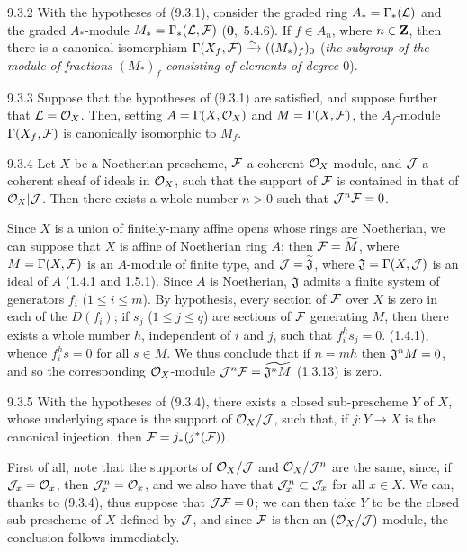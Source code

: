 \documentclass[../main.tex]{subfiles}
\begin{document}
\begin{env}[Corollary]{9.3.2}
    With the hypotheses of {\normalfont(9.3.1)}, consider the graded ring $A_*=\Gamma_*(\mathcal{L})$ and the graded $A_*$-module $M_*=\Gamma_*(\mathcal{L},\mathcal{F})$ {\normalfont(\textbf{0},~5.4.6)}.
    If $f\in A_n$, where $n\in\mathbf{Z}$, then there is a canonical isomorphism $\Gamma(X_f,\mathcal{F})\xrightarrow{\sim}((M_*)_f)_0$ (\emph{the subgroup of the module of fractions $(M_*)_f$ consisting of elements of degree $0$}).
\end{env}
\begin{env}[Corollary]{9.3.3}
    Suppose that the hypotheses of {\normalfont(9.3.1)} are satisfied, and suppose further that $\mathcal{L}=\mathcal{O}_X$.
    Then, setting $A=\Gamma(X,\mathcal{O}_X)$ and $M=\Gamma(X,\mathcal{F})$, the $A_f$-module $\Gamma(X_f,\mathcal{F})$ is canonically isomorphic to $M_f$.
\end{env}
\begin{env}[Proposition]{9.3.4}
    Let $X$ be a Noetherian prescheme, $\mathcal{F}$ a coherent $\mathcal{O}_X$-module, and $\mathcal{J}$ a coherent sheaf of ideals in $\mathcal{O}_X$, such that the support of $\mathcal{F}$ is contained in that of $\mathcal{O}_X|\mathcal{J}$.
    Then there exists a whole number $n>0$ such that $\mathcal{J}^n\mathcal{F}=0$.
\end{env}

Since $X$ is a union of finitely-many affine opens whose rings are Noetherian, we can suppose that $X$ is affine of Noetherian ring $A$; then $\mathcal{F}=\widetilde{M}$, where $M=\Gamma(X,\mathcal{F})$ is an $A$-module of finite type, and $\mathcal{J}=\widetilde{\mathfrak{J}}$, where $\mathfrak{J}=\Gamma(X,\mathcal{J})$ is an ideal of $A$ (1.4.1 and 1.5.1).
Since $A$ is Noetherian, $\mathfrak{J}$ admits a finite system of generators $f_i$ ($1\leqslant i\leqslant m$).
By hypothesis, every section of $\mathcal{F}$ over $X$ is zero in each of the $D(f_i)$; if $s_j$ ($1\leqslant j\leqslant q$) are sections of $\mathcal{F}$ generating $M$, then there exists a whole number $h$, independent of $i$ and $j$, such that $f_i^h s_j=0$. (1.4.1), whence $f_i^h s=0$ for all $s\in M$.
We thus conclude that if $n=mh$ then $\mathfrak{J}^n M=0$, and so the corresponding $\mathcal{O}_X$-module $\mathcal{J}^n\mathcal{F}=\widetilde{\mathfrak{J}^nM}$ (1.3.13) is zero.

\begin{env}[Corollary]{9.3.5}
    With the hypotheses of {\normalfont(9.3.4)}, there exists a closed sub-prescheme $Y$ of $X$, whose underlying space is the support of $\mathcal{O}_X/\mathcal{J}$, such that, if $j\colon Y\to X$ is the canonical injection, then $\mathcal{F}=j_*(j^*(\mathcal{F}))$.
\end{env}

First of all, note that the supports of $\mathcal{O}_X/\mathcal{J}$ and $\mathcal{O}_X/\mathcal{J}^n$ are the same, since, if $\mathcal{J}_x=\mathcal{O}_x$, then $\mathcal{J}_x^n=\mathcal{O}_x$, and we also have that $\mathcal{J}_x^n\subset\mathcal{J}_x$ for all $x\in X$.
We can, thanks to (9.3.4), thus suppose that $\mathcal{J}\mathcal{F}=0$; we can then take $Y$ to be the closed sub-prescheme of $X$ defined by $\mathcal{J}$, and since $\mathcal{F}$ is then an $(\mathcal{O}_X/\mathcal{J})$-module, the conclusion follows immediately.
\end{document}
